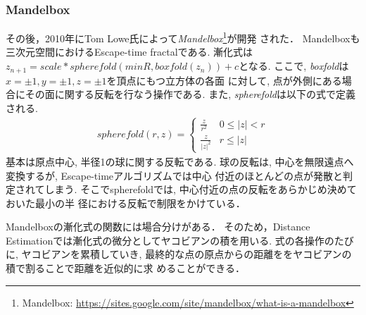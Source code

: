 \subsubsection{Mandelbox}
その後，2010年にTom Lowe氏によって{\it Mandelbox}\footnote{Mandelbox:
\url{https://sites.google.com/site/mandelbox/what-is-a-mandelbox}}が開発
された．
Mandelboxも三次元空間におけるEscape-time fractalである.
漸化式は$z_{n+1} = scale * spherefold(minR, boxfold(z_n)) + c$となる.
ここで, {\it boxfold}は$x=\pm1, y=\pm1, z=\pm1$を頂点にもつ立方体の各面
に対して, 点が外側にある場合にその面に関する反転を行なう操作である.
また, {\it spherefold}は以下の式で定義される.
\begin{eqnarray*}
 spherefold(r, z) = \begin{cases}
                  \frac{z}{r^2} & 0 \le |z| < r \\
                  \frac{z}{|z|^2} & r \le |z|
                 \end{cases}
\end{eqnarray*}
基本は原点中心, 半径1の球に関する反転である.
球の反転は, 中心を無限遠点へ変換するが, Escape-timeアルゴリズムでは中心
付近のほとんどの点が発散と判定されてしまう.
そこでspherefoldでは, 中心付近の点の反転をあらかじめ決めておいた最小の半
径における反転で制限をかけている．

Mandelboxの漸化式の関数には場合分けがある．
そのため，Distance Estimationでは漸化式の微分としてヤコビアンの積を用いる.
式の各操作のたびに, ヤコビアンを累積していき,
最終的な点の原点からの距離ををヤコビアンの積で割ることで距離を近似的に求
めることができる．

